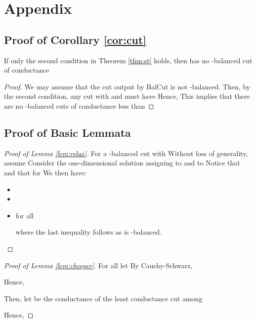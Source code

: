 \documentclass[twoside,leqno,twocolumn]{article}
\numberwithin{equation}{section}
\newcommand{\alg}{{\sc BalCut}\xspace}
\begin{document}



\appendix
\section{Appendix}

\subsection{Proof of Corollary \ref{cor:cut}}\label{app:cut}
\begin{lemma}
If only the second condition in Theorem \ref{thm:st} holds, then  has no -balanced cut of conductance 
\end{lemma}
\begin{proof}
We may assume that the cut  output by \alg is not -balanced. Then, by the second condition, any cut  with  and  must have 
Hence,  This implies that there are no -balanced cuts of conductance less than 
\end{proof}

\subsection{Proof of Basic Lemmata} \label{app:basic}

\begin{proof}[Proof of Lemma \ref{lem:relax}]
For a -balanced cut  with  Without loss of generality, assume  Consider the one-dimensional solution assigning  to  and  to  Notice that  and that  for 
We then have:
\begin{itemize}
 \item 
\item
 
\item for all  


\noindent
where the last inequality follows as  is -balanced.
\end{itemize}
\end{proof}

\begin{proof}[Proof of Lemma \ref{lem:cheeger}]
For all  let 
By Cauchy-Schwarz,

Hence,

Then, let  be the conductance of the least conductance cut among 

Hence, 



\end{proof}
\end{document}
